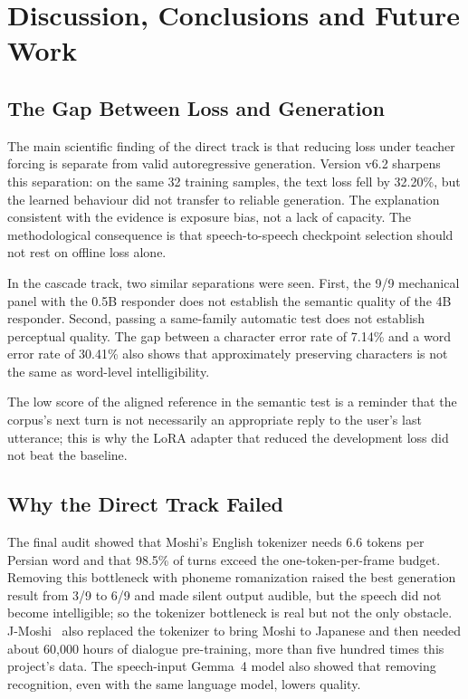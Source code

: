 \chapter{Discussion, Conclusions and Future Work}
\label{ch:conclusions}

\section{The Gap Between Loss and Generation}

The main scientific finding of the direct track is that reducing loss under
teacher forcing is separate from valid autoregressive generation. Version v6.2
sharpens this separation: on the same 32 training samples, the text loss fell by
32.20\%, but the learned behaviour did not transfer to reliable generation. The
explanation consistent with the evidence is exposure bias, not a lack of
capacity. The methodological consequence is that speech-to-speech checkpoint
selection should not rest on offline loss alone.

In the cascade track, two similar separations were seen. First, the 9/9
mechanical panel with the 0.5B responder does not establish the semantic quality
of the 4B responder. Second, passing a same-family automatic test does not
establish perceptual quality. The gap between a character error rate of 7.14\%
and a word error rate of 30.41\% also shows that approximately preserving
characters is not the same as word-level intelligibility.

The low score of the aligned reference in the semantic test is a reminder that the
corpus's next turn is not necessarily an appropriate reply to the user's last
utterance; this is why the LoRA adapter that reduced the development loss did not
beat the baseline.

\section{Why the Direct Track Failed}

The final audit showed that Moshi's English tokenizer needs 6.6 tokens per Persian
word and that 98.5\% of turns exceed the one-token-per-frame budget. Removing this
bottleneck with phoneme romanization raised the best generation result from 3/9 to
6/9 and made silent output audible, but the speech did not become intelligible; so
the tokenizer bottleneck is real but not the only obstacle.
J-Moshi~\cite{ohashi2025jmoshi} also replaced the tokenizer to bring Moshi to
Japanese and then needed about 60,000 hours of dialogue pre-training, more than
five hundred times this project's data. The speech-input Gemma~4 model also showed
that removing recognition, even with the same language model, lowers quality.

